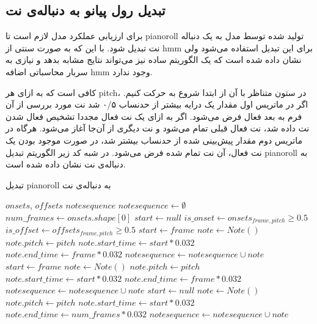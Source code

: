 \subsection{تبدیل رول پیانو به دنباله‌ی نت}
برای ارزیابی عملکرد مدل لازم است تا \gls{pianoroll} تولید شده توسط مدل به یک
دنباله نت تبدیل شود. با این که به صورت سنتی از \gls{hmm} برای این تبدیل استفاده
می‌شود ولی نشان داده شده است که یک الگوریتم ساده نیز می‌تواند نتایج مشابه بدهد و
نیازی به سربار محاسباتی اضافه \gls{hmm} وجود ندارد.

کافی است که به ازای هر \gls{pitch}، در ستون متناظر با آن از ابتدا شروع به حرکت
کنیم. اگر در ماتریس اول مقدار یک درایه بیشتر از حدنساب ۰/۵ شد نت مورد بررسی از
آن فرم به بعد فعال فرض می‌شود. اگر به ازای یک نت فعال مجددا تشخیص فعال شدن نت
داده شد، نت فعال قبلی تمام می‌شود و نت دیگری از آن‌جا آغاز می‌شود. هرگاه در
ماتریس دوم مقدار پیش‌بینی شده از حدنساب بیشتر شد، در صورت موجود بودن یک نت فعال،
آن نت تمام شده فرض می‌شود. در شبه کد زیر الگوریتم تبدیل \gls{pianoroll} به
دنباله‌ی نت نشان داده شده است.
\begin{algorithm}[ht]
\caption{تبدیل \gls{pianoroll} به دنباله‌ی نت}
\begin{algorithmic}
\begin{latin}
    \Require $onsets$, $offsets$
    \Ensure $notesequence$
    \State $notesequence \leftarrow \emptyset$
    \State $num\_frames \leftarrow onsets.shape[0]$
        \State $start \leftarrow null$
            \State $is\_onset \leftarrow onsets_{frame, pitch} \geq 0.5$
            \State $is\_offset \leftarrow offsets_{frame, pitch} \geq 0.5$
                \State $start \leftarrow frame$
                \State $note \leftarrow Note()$
                \State $note.pitch \leftarrow pitch$
                \State $note.start\_time \leftarrow start * 0.032$
                \State $note.end\_time \leftarrow frame * 0.032$
                \State $notesequence \leftarrow notesequence \cup note$
                \State $start \leftarrow frame$
                \State $note \leftarrow Note()$
                \State $note.pitch \leftarrow pitch$
                \State $note.start\_time \leftarrow start * 0.032$
                \State $note.end\_time \leftarrow frame * 0.032$
                \State $notesequence \leftarrow notesequence \cup note$
                \State $start \leftarrow null$
            \EndIf
        \EndFor
            \State $note \leftarrow Note()$
            \State $note.pitch \leftarrow pitch$
            \State $note.start\_time \leftarrow start * 0.032$
            \State $note.end\_time \leftarrow num\_frames * 0.032$
            \State $notesequence \leftarrow notesequence \cup note$
        \EndIf
    \EndFor
\end{latin}
\end{algorithmic}
\end{algorithm}

